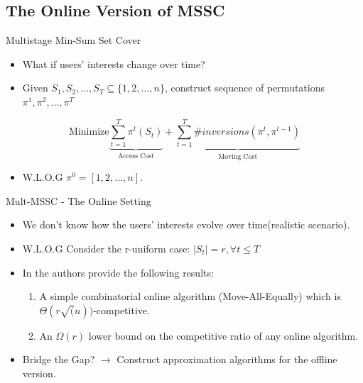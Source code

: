 \documentclass{beamer}
\def\DSSC{\mathrm{Mult}\text{-}\mathrm{MSSC}}
\begin{document}
\subsection{The Online Version of MSSC}

\begin{frame}{Multistage Min-Sum Set Cover}
    \begin{itemize}
         \item What if users' interests change over time?
         \item Given $S_1, S_2, \ldots, S_T \subseteq\{1,2,\ldots,n\}$, construct sequence of permutations $\pi^1, \pi^2, ..., \pi^T$
    \end{itemize}
    
     $$\text{Minimize} \underbrace{\sum_{t=1}^T \pi^t ( S_t )}_{\text{Access Cost}} + \underbrace{\sum_{t=1}^T \#inversions( \pi^t, \pi^{t-1} )}_{\text{Moving Cost}}$$
    
    \begin{itemize}
         \item W.L.O.G $\pi^0 = [ 1,2, \ldots, n ]$.
    \end{itemize}
\end{frame}

\begin{frame}{$\DSSC$ - The Online Setting}
    \begin{itemize}
         \item We don't know how the users' interests evolve over time(realistic scenario).
         \item W.L.O.G Consider the r-uniform case: $|S_t|=r, \forall t \leq T$
         \item In \cite{FKKSV20} the authors provide the following results:
            \begin{enumerate}
                 \item A simple combinatorial online algorithm (Move-All-Equally) which is $\Theta(r \sqrt(n) )$-competitive. \\
                
                 \item An $\Omega(r)$ lower bound on the competitive ratio of any online algorithm.
            \end{enumerate}
         \item Bridge the Gap? $\rightarrow$  Construct approximation algorithms for the offline version.
    \end{itemize}
\end{frame}
\end{document}
